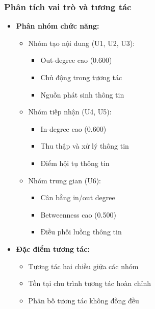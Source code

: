 \documentclass[12pt,a4paper]{article}
\begin{document}
\subsubsection{Phân tích vai trò và tương tác}
\begin{itemize}
\item \textbf{Phân nhóm chức năng:}
    \begin{itemize}
    \item Nhóm tạo nội dung (U1, U2, U3):
        \begin{itemize}
        \item Out-degree cao (0.600)
        \item Chủ động trong tương tác
        \item Nguồn phát sinh thông tin
        \end{itemize}
    \item Nhóm tiếp nhận (U4, U5):
        \begin{itemize}
        \item In-degree cao (0.600)
        \item Thu thập và xử lý thông tin
        \item Điểm hội tụ thông tin
        \end{itemize}
    \item Nhóm trung gian (U6):
        \begin{itemize}
        \item Cân bằng in/out degree
        \item Betweenness cao (0.500)
        \item Điều phối luồng thông tin
        \end{itemize}
    \end{itemize}

\item \textbf{Đặc điểm tương tác:}
    \begin{itemize}
    \item Tương tác hai chiều giữa các nhóm
    \item Tồn tại chu trình tương tác hoàn chỉnh
    \item Phân bố tương tác không đồng đều
    \end{itemize}


\end{itemize}
\end{document}
